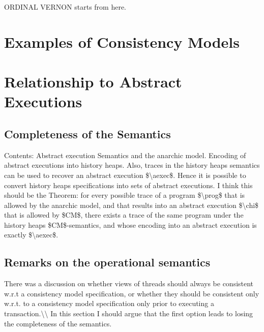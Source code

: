 \documentclass[acmsmall,review,anonymous]{acmart}\settopmatter{printfolios=true,printccs=false,printacmref=false}
\begin{document}
\newcommand{\RootPath}{..}



%
%
%
%
\ac{ORDINAL VERNON starts from here.}


\section{Examples of Consistency Models}

%
%

\section{Relationship to Abstract Executions}


\subsection{Completeness of the Semantics} 
\ac{Contents: Abstract execution Semantics and the anarchic model. 
Encoding of abstract executions into history heaps. Also, 
traces in the history heaps semantics can be used to recover 
an abstract execution $\aexec$. Hence it is possible to convert history heaps 
specifications into sets of abstract executions.
I think this should be the Theorem: for every possible trace of a program $\prog$ that is allowed by the anarchic 
model, and that results into an abstract execution $\chi$ that is allowed by $CM$, there 
exists a trace of the same program under the history heaps $CM$-semantics, 
and whose encoding into an abstract execution is exactly $\aexec$.}
\subsection{Remarks on the operational semantics}
\ac{There was a discussion on whether views of threads should always be consistent w.r.t a 
consistency model specification, or whether they should be consistent only w.r.t. to 
a consistency model specification only prior to executing a transaction.\\ 
In this section I should argue that the first option leads to losing the completeness of the 
semantics.}
\end{document}
